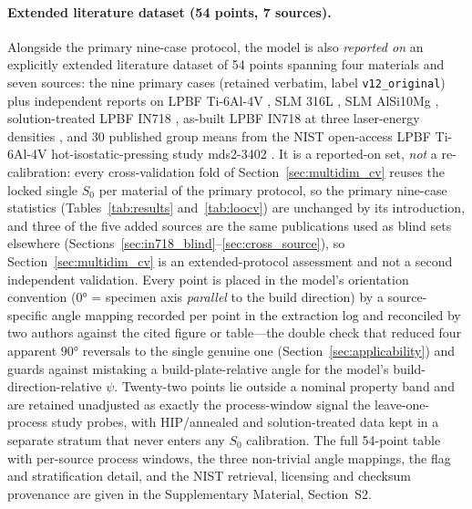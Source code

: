 \documentclass[twocolumn]{sagej}
\begin{document}
\paragraph{Extended literature dataset (54 points, 7 sources).}
Alongside the primary nine-case protocol, the model is also \emph{reported on} an explicitly extended literature dataset of 54 points spanning four materials and seven sources: the nine primary cases (retained verbatim, label \texttt{v12\_original}) plus independent reports on LPBF Ti-6Al-4V \cite{sun2024ti64adem}, SLM 316L \cite{hitzler2017materials}, SLM AlSi10Mg \cite{metals2018alsi_aniso}, solution-treated LPBF IN718 \cite{hovig2018in718}, as-built LPBF IN718 at three laser-energy densities \cite{watring2020addma}, and 30 published group means from the NIST open-access LPBF Ti-6Al-4V hot-isostatic-pressing study mds2-3402 \cite{nisthip_ti64,nistir8551}. It is a reported-on set, \emph{not} a re-calibration: every cross-validation fold of Section~\ref{sec:multidim_cv} reuses the locked single $S_0$ per material of the primary protocol, so the primary nine-case statistics (Tables~\ref{tab:results} and~\ref{tab:loocv}) are unchanged by its introduction, and three of the five added sources are the same publications used as blind sets elsewhere (Sections~\ref{sec:in718_blind}--\ref{sec:cross_source}), so Section~\ref{sec:multidim_cv} is an extended-protocol assessment and not a second independent validation. Every point is placed in the model's orientation convention ($\ang{0}$ = specimen axis \emph{parallel} to the build direction) by a source-specific angle mapping recorded per point in the extraction log and reconciled by two authors against the cited figure or table---the double check that reduced four apparent $\ang{90}$ reversals to the single genuine one (Section~\ref{sec:applicability}) and guards against mistaking a build-plate-relative angle for the model's build-direction-relative $\psi$. Twenty-two points lie outside a nominal property band and are retained unadjusted as exactly the process-window signal the leave-one-process study probes, with HIP/annealed and solution-treated data kept in a separate stratum that never enters any $S_0$ calibration. The full 54-point table with per-source process windows, the three non-trivial angle mappings, the flag and stratification detail, and the NIST retrieval, licensing and checksum provenance are given in the Supplementary Material, Section~S2.

\end{document}
